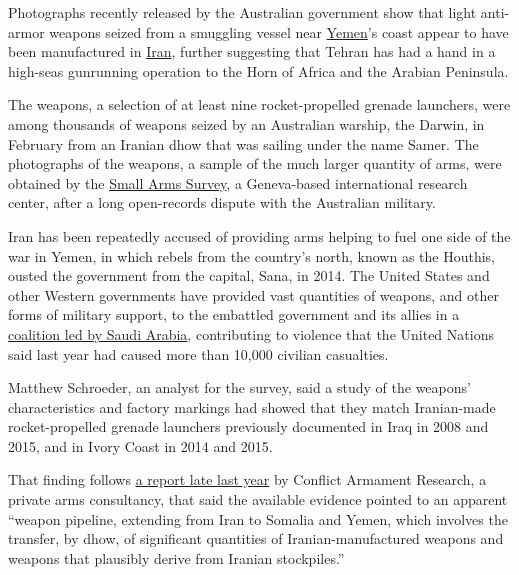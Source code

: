 Photographs recently released by the Australian government show that
light anti-armor weapons seized from a smuggling vessel near
\href{https://www.nytimes3xbfgragh.onion/topic/destination/yemen?8qa}{Yemen}'s
coast appear to have been manufactured in
\href{https://www.nytimes3xbfgragh.onion/topic/destination/iran?8qa}{Iran},
further suggesting that Tehran has had a hand in a high-seas gunrunning
operation to the Horn of Africa and the Arabian Peninsula.

The weapons, a selection of at least nine rocket-propelled grenade
launchers, were among thousands of weapons seized by an Australian
warship, the Darwin, in February from an Iranian dhow that was sailing
under the name Samer. The photographs of the weapons, a sample of the
much larger quantity of arms, were obtained by the
\href{http://www.smallarmssurvey.org/}{Small Arms Survey}, a
Geneva-based international research center, after a long open-records
dispute with the Australian military.

Iran has been repeatedly accused of providing arms helping to fuel one
side of the war in Yemen, in which rebels from the country's north,
known as the Houthis, ousted the government from the capital, Sana, in
2014. The United States and other Western governments have provided vast
quantities of weapons, and other forms of military support, to the
embattled government and its allies in a
\href{https://www.nytimes3xbfgragh.onion/2016/10/10/world/middleeast/yemen-saudi-arabia-military.html?action=click\&contentCollection=Middle\%20East\&module=RelatedCoverage\&region=Marginalia\&pgtype=article}{coalition
led by Saudi Arabia}, contributing to violence that the United Nations
said last year had caused more than 10,000 civilian casualties.

Matthew Schroeder, an analyst for the survey, said a study of the
weapons' characteristics and factory markings had showed that they match
Iranian-made rocket-propelled grenade launchers previously documented in
Iraq in 2008 and 2015, and in Ivory Coast in 2014 and 2015.

That finding follows
\href{https://www.washingtonpost.com/news/checkpoint/wp/2016/11/30/how-iranian-weapons-are-ending-up-in-yemen/?utm_term=.f5126d97f1e7}{a
report late last year} by Conflict Armament Research, a private arms
consultancy, that said the available evidence pointed to an apparent
``weapon pipeline, extending from Iran to Somalia and Yemen, which
involves the transfer, by dhow, of significant quantities of
Iranian-manufactured weapons and weapons that plausibly derive from
Iranian stockpiles.''

